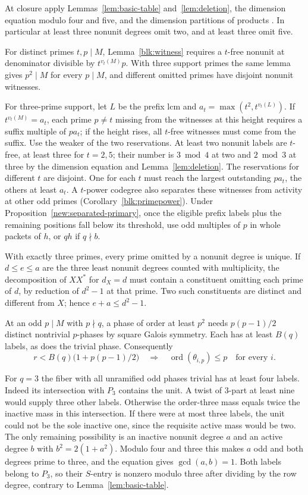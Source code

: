 \documentclass[11pt]{amsart}
\numberwithin{equation}{section}
\theoremstyle{definition}
\theoremstyle{plain}
\begin{document}
At closure apply Lemmas~\ref{lem:basic-table} and~\ref{lem:deletion},
the dimension equation modulo four and five, and the dimension
partitions of products \cite[\S6.4]{ABPP}. In particular at least
three nonunit degrees omit two, and at least three omit five.

For distinct primes $t,p\mid M$, Lemma~\ref{blk:witness}
requires a $t$-free nonunit at denominator divisible by
$t^{v_t(M)}p$. With three support primes the same lemma gives
$p^2\mid M$ for every $p\mid M$, and different omitted primes
have disjoint nonunit witnesses.

For three-prime support, let $L$ be the prefix lcm and
$a_t=\max(t^2,t^{v_t(L)})$. If $t^{v_t(M)}=a_t$, each prime $p\ne t$ missing from the witnesses at this height requires a suffix multiple of $pa_t$; if the height rises, all $t$-free witnesses must come from the suffix. Use the weaker of the two reservations. At least two nonunit labels are $t$-free, at least three for $t=2,5$; their number is $3\bmod4$ at two and $2\bmod3$ at three by the dimension equation and Lemma~\ref{lem:deletion}. The reservations for different $t$ are disjoint. One for each $t$ must reach the largest outstanding $pa_t$, the others at least $a_t$. A $t$-power codegree also separates these witnesses from activity at other odd primes (Corollary~\ref{blk:primepower}). Under Proposition~\ref{new:separated-primary}, once the eligible prefix labels plus the remaining positions fall below its threshold, use odd multiples of $p$ in whole packets of $h$, or $qh$ if $q\nmid b$.

With exactly three primes, every prime omitted by a nonunit degree is
unique. If $d\le e\le a$ are the three least nonunit degrees counted with
multiplicity, the decomposition of $XX^*$ for $d_X=d$ must contain
a constituent omitting each prime of $d$, by reduction of $d^2-1$
at that prime. Two such constituents are distinct and different from
$X$; hence $e+a\le d^2-1$.

At an odd $p\mid M$ with $p\nmid q$, a phase of order at least
$p^2$ needs $p(p-1)/2$ distinct nontrivial $p$-phases by square
Galois symmetry. Each has at least $B(q)$ labels, as does the
trivial phase. Consequently
\[
 r<B(q)\bigl(1+p(p-1)/2\bigr)
 \quad\Longrightarrow\quad \operatorname{ord}(\theta_{i,p})\le p
 \quad\text{for every } i .
\]


For $q=3$ the fiber with all unramified odd phases trivial has at least
four labels. Indeed its intersection with $P_3$ contains the unit.
A twist of $3$-part at least nine would supply three other labels.
Otherwise the order-three mass equals twice the inactive mass in
this intersection. If there were at most three labels, the unit
could not be the sole inactive one, since the requisite active mass
would be two. The only remaining possibility is an inactive nonunit
degree $a$ and an active degree $b$ with $b^2=2(1+a^2)$.
Modulo four and three this makes $a$ odd and both degrees prime to
three, and the equation gives $\gcd(a,b)=1$. Both labels belong to
$P_3$, so their $S$-entry is nonzero modulo three after dividing by
the row degree, contrary to Lemma~\ref{lem:basic-table}.
\end{document}
